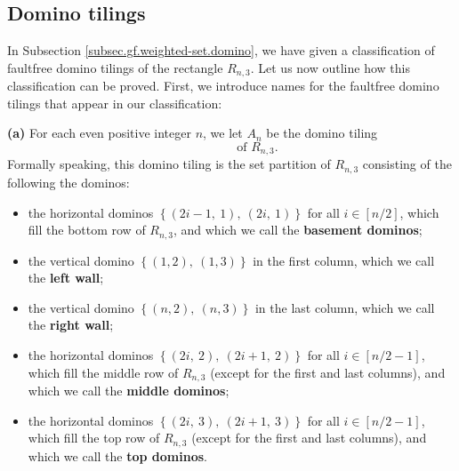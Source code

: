 \subsection{\label{sec.details.domino}Domino tilings}

\begin{fineprint}
In Subsection \ref{subsec.gf.weighted-set.domino}, we have given a
classification of faultfree domino tilings of the rectangle $R_{n,3}$. Let us
now outline how this classification can be proved. First, we introduce names
for the faultfree domino tilings that appear in our classification:

\begin{definition}
\label{def.gf.weighted-set.domino.Rn3.ABC}\textbf{(a)} For each even positive
integer $n$, we let $A_{n}$ be the domino tiling%
\[%
\qquad%
\ \ \ \ \ \ \ \ \ \ \text{of }R_{n,3}.
\]
Formally speaking, this domino tiling is the set partition of $R_{n,3}$
consisting of the following the dominos:

\begin{itemize}
\item the horizontal dominos $\left\{  \left(  2i-1,\ 1\right)  ,\ \left(
2i,\ 1\right)  \right\}  $ for all $i\in\left[  n/2\right]  $, which fill the
bottom row of $R_{n,3}$, and which we call the \textbf{basement dominos};

\item the vertical domino $\left\{  \left(  1,2\right)  ,\ \left(  1,3\right)
\right\}  $ in the first column, which we call the \textbf{left wall};

\item the vertical domino $\left\{  \left(  n,2\right)  ,\ \left(  n,3\right)
\right\}  $ in the last column, which we call the \textbf{right wall};

\item the horizontal dominos $\left\{  \left(  2i,\ 2\right)  ,\ \left(
2i+1,\ 2\right)  \right\}  $ for all $i\in\left[  n/2-1\right]  $, which fill
the middle row of $R_{n,3}$ (except for the first and last columns), and which
we call the \textbf{middle dominos};

\item the horizontal dominos $\left\{  \left(  2i,\ 3\right)  ,\ \left(
2i+1,\ 3\right)  \right\}  $ for all $i\in\left[  n/2-1\right]  $, which fill
the top row of $R_{n,3}$ (except for the first and last columns), and which we
call the \textbf{top dominos}.
\end{itemize}


\end{definition}
\end{fineprint}
